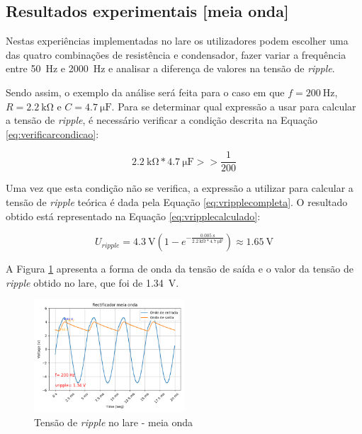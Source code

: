 \subsection{Resultados experimentais [meia onda]}
\label{sec:resultados_RectificadoresMeiaOnda}
Nestas experiências implementadas no \acrshort{lare} os utilizadores podem escolher uma das quatro combinações de resistência e condensador, fazer variar a frequência entre \SI{50}{\hertz} e \SI{2000}{\hertz} e analisar a diferença de valores na tensão de \textit{ripple}.

Sendo assim, o exemplo da análise será feita para o caso em que $f=\SI{200}{\hertz}$, $R=\SI{2.2}{\kilo\ohm}$ e $C=\SI{4.7}{\micro\farad}$. Para se determinar qual expressão a usar para calcular a tensão de \textit{ripple}, é necessário verificar a condição descrita na Equação \ref{eq:verificarcondicao}:

\begin{equation} \label{eq:verificarcondicao}
	\SI{2.2}{\kilo\ohm} * \SI{4.7}{\micro\farad} >> \dfrac{1}{200}
\end{equation}

Uma vez que esta condição não se verifica, a expressão a utilizar para calcular a tensão de \textit{ripple} teórica é dada pela Equação \ref{eq:vripplecompleta}. O resultado obtido está representado na Equação \ref{eq:vripplecalculado}:

\begin{equation} \label{eq:vripplecalculado}
	U_{ripple} = \SI{4.3}{\volt}(1-e^{-\frac{\SI{0.005}{\second}}{\SI{2.2}{\kilo\ohm}*\SI{4.7}{\micro\farad}}}) \approx \SI{1.65}{\volt}
\end{equation}

A Figura \ref{fig:ripplelaremeiaonda} apresenta a forma de onda da tensão de saída e o valor da tensão de \textit{ripple} obtido no \acrshort{lare}, que foi de \SI{1.34}{\volt}.

\begin{figure}[hbtp]
	\centering
	\includegraphics[width=0.5\textwidth]{figures/resultados_LaRE_meia_onda.png}
	\caption{Tensão de \textit{ripple} no \acrshort{lare} - meia onda}
	\label{fig:ripplelaremeiaonda}
\end{figure}

